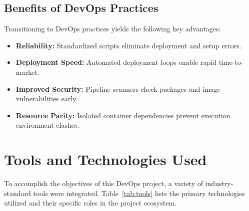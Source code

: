 \documentclass[12pt,a4paper]{article}
\begin{document}
\subsection{Benefits of DevOps Practices}
Transitioning to DevOps practices yields the following key advantages:
\begin{itemize}[noitemsep, topsep=1pt, parsep=0pt, partopsep=0pt, leftmargin=*]
    \item \textbf{Reliability:} Standardized scripts eliminate deployment and setup errors.
    \item \textbf{Deployment Speed:} Automated deployment loops enable rapid time-to-market.
    \item \textbf{Improved Security:} Pipeline scanners check packages and image vulnerabilities early.
    \item \textbf{Resource Parity:} Isolated container dependencies prevent execution environment clashes.
\end{itemize}

\section{Tools and Technologies Used}

To accomplish the objectives of this DevOps project, a variety of industry-standard tools were integrated. Table~\ref{tab:tools} lists the primary technologies utilized and their specific roles in the project ecosystem.
\end{document}
